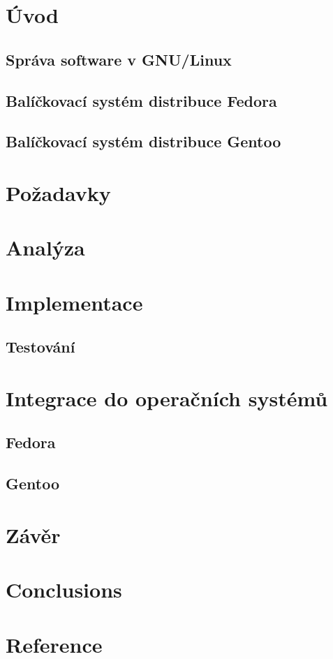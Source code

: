 \documentclass[10pt,a4paper]{article}
\begin{document}
	
	
	
	\tableofcontents
	\newpage
	
	\section{Úvod}
		\subsection{Správa software v GNU/Linux}
		\subsection{Balíčkovací systém distribuce Fedora}
		\subsection{Balíčkovací systém distribuce Gentoo}

	\section{Požadavky}	
	\section{Analýza}
	\section{Implementace}
		\subsection{Testování}

	\section{Integrace do operačních systémů}
		\subsection{Fedora}
		\subsection{Gentoo}
		
	\section{Závěr} %
	\section{Conclusions} %
	\section{Reference} %
	
\end{document}
